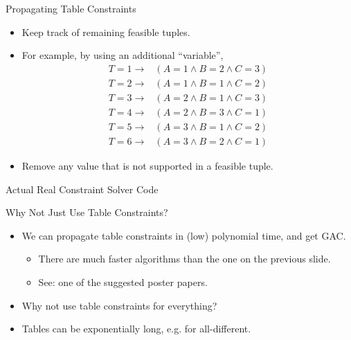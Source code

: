 \documentclass{beamer}
\begin{document}
\begin{frame}{Propagating Table Constraints}
    \begin{itemize}
        \item Keep track of remaining feasible tuples.
        \item For example, by using an additional ``variable'', \begin{align*}
                T = 1 \rightarrow{} &(A = 1 \land B = 2 \land C = 3) \\
                T = 2 \rightarrow{} &(A = 1 \land B = 1 \land C = 2) \\
                T = 3 \rightarrow{} &(A = 2 \land B = 1 \land C = 3) \\
                T = 4 \rightarrow{} &(A = 2 \land B = 3 \land C = 1) \\
                T = 5 \rightarrow{} &(A = 3 \land B = 1 \land C = 2) \\
                T = 6 \rightarrow{} &(A = 3 \land B = 2 \land C = 1)
        \end{align*}
        \item Remove any value that is not supported in a feasible tuple.
    \end{itemize}
\end{frame}

\begin{frame}{Actual Real Constraint Solver Code}
    \vspace*{-0.5em}%
    \only<1>{}%
\end{frame}

\begin{frame}{Why Not Just Use Table Constraints?}
    \begin{itemize}
        \item We can propagate table constraints in (low) polynomial time, and get GAC.
            \begin{itemize}
                \item There are much faster algorithms than the one on the
                    previous slide.
                \item See: one of the suggested poster papers.
            \end{itemize}
        \item Why not use table constraints for everything?
        \item <2-> Tables can be exponentially long, e.g. for all-different.
    \end{itemize}
\end{frame}
\end{document}
